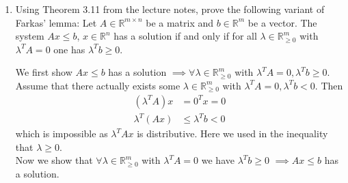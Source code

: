 \documentclass[11pt]{article}
\newcommand{\setR}{\mathbb{R}}
\renewcommand{\leq}{\leqslant}
\renewcommand{\geq}{\geqslant}
\begin{document}
\begin{enumerate}[1)]
\begin{solution}
We have that as $x^\ast, y^\ast$ are optimal, $c^Tx^\ast = b^Ty^\ast$ by strong duality. Then 
\begin{align*}
c^Tx^\ast & = \displaystyle\sum_{i =1}^n x^\ast_i c_i \\
& =  \displaystyle\sum_{i =1}^n x^\ast_i \left( \displaystyle\sum_{j =1}^m A_{ji}y^\ast_j \right) \\
& = \displaystyle\sum_{j =1}^m y^\ast_j \left( \displaystyle\sum_{i =1}^n A_{ji}x^\ast_i \right) \\
& = \displaystyle\sum_{j =1}^m y^\ast_j (A_j x^\ast) \\
& \leq \displaystyle\sum_{j =1}^m y^\ast_j  b_j \\
& = {y^\ast}^T b
\end{align*}
where we have used that $y^\ast_j \geq 0$ for every $j$ in the last inequality. Then as the above inequalities must hold with equality everywhere since $c^Tx^\ast = b^Ty^\ast$, it must be that if $y^\ast_j >0$ then $A_j x^\ast = b_j$.

\end{solution}

\item Using Theorem 3.11 from the lecture notes, prove the following variant of Farkas' lemma:
  Let $A\in\setR^{m\times n}$ be a matrix and $b\in\setR^m$ be a vector.
  The system $Ax \leq b$, $x\in\setR^n$ has a solution if and only if
  for all $\lambda\in\setR^m_{\geq0}$ with $\lambda^T A = 0$ one has $\lambda^T b \geq 0$.    

\begin{solution}
We first show $Ax \leq b$ has a solution $\implies \forall \lambda \in \mathbb{R}^m_{\geq 0}$ with $\lambda^T A = 0, \lambda^Tb \geq 0$.  \\

Assume that there actually exists some $\lambda \in \setR^m_{\geq 0}$ with $\lambda^TA = 0, \lambda^T b <0$. 
Then 
\begin{align*}
(\lambda^T A)x & = 0^T x = 0\\
\lambda^T (Ax) & \leq \lambda^T b < 0 
\end{align*}
which is impossible as  $\lambda^T Ax$ is distributive. Here we used in the inequality that $\lambda \geq 0$. \\

Now we show that  $ \forall \lambda \in \mathbb{R}^m_{\geq 0}$ with $\lambda^T A = 0$ we have $\lambda^Tb \geq 0$ $\implies Ax \leq b$ has a solution. \\


\end{solution}
\end{enumerate}
\end{document}
